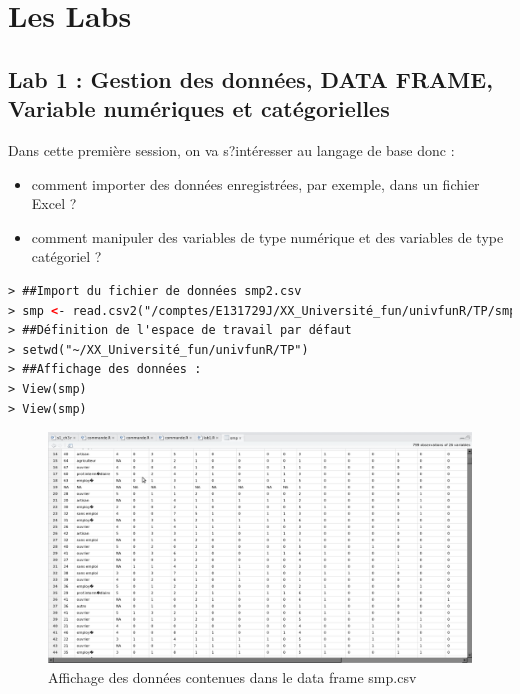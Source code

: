 


\chapter{Les Labs}

\section{Lab 1 : Gestion des données, DATA FRAME, Variable numériques et catégorielles}

Dans cette première session, on va s?intéresser au langage de base donc :
\begin{itemize}
\item comment importer des données enregistrées, par exemple, dans un fichier Excel ?
\item comment manipuler des variables de type numérique et des variables de type catégoriel ?
\end{itemize}

\begin{lstlisting}[language=html]
> ##Import du fichier de données smp2.csv
> smp <- read.csv2("/comptes/E131729J/XX_Université_fun/univfunR/TP/smp2.csv")
> ##Définition de l'espace de travail par défaut
> setwd("~/XX_Université_fun/univfunR/TP")
> ##Affichage des données :
> View(smp)
> View(smp)
\end{lstlisting}

\begin{figure}[H]\begin{center}\includegraphics[scale=0.35]{ilu/lab1smp.png}\caption{Affichage des données contenues dans le data frame smp.csv}\end{center}\end{figure}

